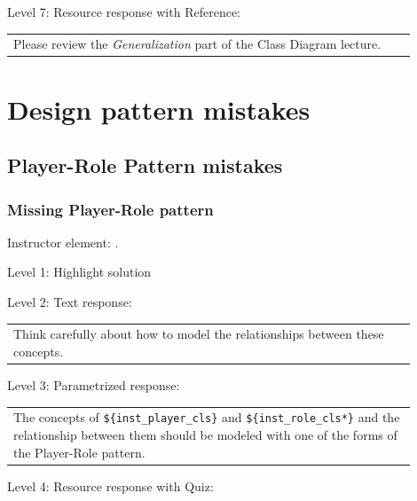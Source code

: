 \noindent Level 7: Resource response with Reference: \medskip

\begin{tabular}{|p{0.9\linewidth}}
Please review the \textit{Generalization} part of the Class Diagram lecture.
\end{tabular} \medskip




\section{Design pattern mistakes}

\subsection{Player-Role Pattern mistakes}

\subsubsection{Missing Player-Role pattern}

Instructor element: . \medskip

\noindent Level 1: Highlight solution  \medskip

\noindent Level 2: Text response: \medskip

\begin{tabular}{|p{0.9\linewidth}}
Think carefully about how to model the relationships between these concepts.
\end{tabular} \medskip

\noindent Level 3: Parametrized response: \medskip

\begin{tabular}{|p{0.9\linewidth}}
The concepts of \verb|${inst_player_cls}| and \verb|${inst_role_cls*}| and the relationship between them should be modeled with one of the forms of the Player-Role pattern.
\end{tabular} \medskip

\noindent Level 4: Resource response with Quiz: \medskip


